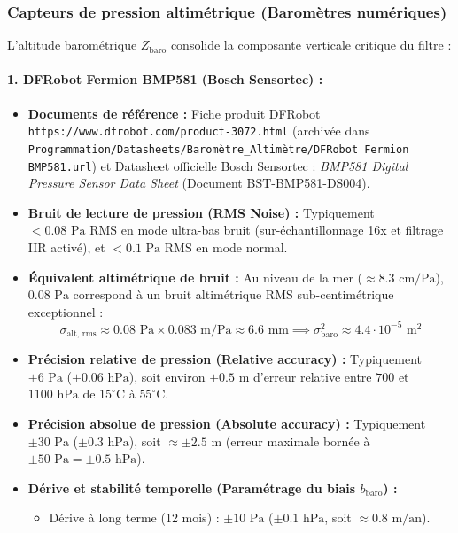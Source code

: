 \documentclass[../Formulations_Kalman.tex]{subfiles}
\begin{document}
\subsubsection{Capteurs de pression altimétrique (Baromètres numériques)}
L'altitude barométrique $Z_{\text{baro}}$ consolide la composante verticale critique du filtre :

\paragraph{1. DFRobot Fermion BMP581 (Bosch Sensortec) :}
\begin{itemize}
    \item \textbf{Documents de référence :} Fiche produit DFRobot \texttt{https://www.dfrobot.com/product-3072.html} (archivée dans \texttt{Programmation/Datasheets/Baromètre\_Altimètre/DFRobot Fermion BMP581.url}) et Datasheet officielle Bosch Sensortec : \textit{BMP581 Digital Pressure Sensor Data Sheet} (Document BST-BMP581-DS004).
    \item \textbf{Bruit de lecture de pression (RMS Noise) :} Typiquement \textbf{$< 0.08\text{ Pa RMS}$} en mode ultra-bas bruit (sur-échantillonnage 16x et filtrage IIR activé), et $< 0.1\text{ Pa RMS}$ en mode normal.
    \item \textbf{Équivalent altimétrique de bruit :} Au niveau de la mer ($\approx 8.3\text{ cm/Pa}$), $0.08\text{ Pa}$ correspond à un bruit altimétrique RMS sub-centimétrique exceptionnel :
    \begin{equation}
    \sigma_{\text{alt, rms}} \approx 0.08\text{ Pa} \times 0.083\text{ m/Pa} \approx 6.6\text{ mm} \implies \sigma_{\text{baro}}^2 \approx 4.4 \cdot 10^{-5}\text{ m}^2
    \end{equation}
    \item \textbf{Précision relative de pression (Relative accuracy) :} Typiquement $\pm 6\text{ Pa}$ ($\pm 0.06\text{ hPa}$), soit environ $\pm 0.5\text{ m}$ d'erreur relative entre $700$ et $1100\text{ hPa}$ de $15^\circ\text{C}$ à $55^\circ\text{C}$.
    \item \textbf{Précision absolue de pression (Absolute accuracy) :} Typiquement $\pm 30\text{ Pa}$ ($\pm 0.3\text{ hPa}$), soit $\approx \pm 2.5\text{ m}$ (erreur maximale bornée à $\pm 50\text{ Pa} = \pm 0.5\text{ hPa}$).
    \item \textbf{Dérive et stabilité temporelle (Paramétrage du biais $b_{\text{baro}}$) :}
    \begin{itemize}
        \item Dérive à long terme (12 mois) : $\pm 10\text{ Pa}$ ($\pm 0.1\text{ hPa}$, soit $\approx 0.8\text{ m/an}$).

\end{itemize}
\end{itemize}
\end{document}
